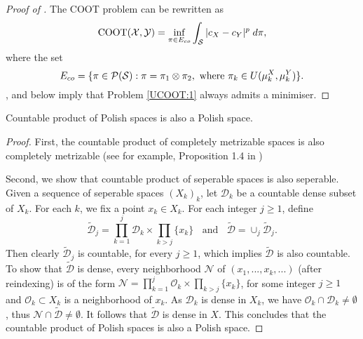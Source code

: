 \begin{proof}[Proof of ]
    The COOT problem can be rewritten as
    \begin{equation} \label{UCOOT:1}
      \text{COOT}(\mathcal X, \mathcal Y) = \inf_{\pi \in E_{co}} \int_{\mathcal S} \vert c_X - c_Y \vert^p \; d\pi,
    \end{equation}
    where the set
    \begin{equation}
      E_{co} = \{ \pi \in \mathcal P(\mathcal S): \pi = \pi_1 \otimes \pi_2,
      \text{ where } \pi_k \in U(\mu_k^X, \mu_k^Y) \}.
    \end{equation}
    ,  and 
    below imply that Problem \eqref{UCOOT:1} always admits a minimiser.
  \end{proof}
  \begin{lemma} \label{product_polish}
    Countable product of Polish spaces is also a Polish space.
  \end{lemma}
  \begin{proof}
    First, the countable product of completely metrizable spaces is also completely metrizable
    (see for example, Proposition 1.4 in \citep{Dominique20})

    Second, we show that countable product of seperable spaces is also seperable.
    Given a sequence of seperable spaces $(X_k)_k$,
    let $\mathcal D_k$ be a countable dense subset of $X_k$. For each $k$,
    we fix a point $x_k \in X_k$. For each integer $j \geq 1$, define
    \begin{equation}
      \widetilde{\mathcal D}_j = \prod_{k=1}^j \mathcal D_k \times \prod_{k > j} \{ x_k \}
      \;\; \text{ and } \;\;
      \widetilde{\mathcal D} = \cup_{j} \widetilde{\mathcal D}_j.
    \end{equation}
    Then clearly $\widetilde{\mathcal D}_j$ is countable, for every $j \geq 1$,
    which implies $\widetilde{\mathcal D}$ is also countable.
    To show that $\widetilde{\mathcal D}$ is dense, every neighborhood $\mathcal N$ of
    $(x_1, ..., x_k, ...)$ (after reindexing) is of the form
    $\mathcal N = \prod_{k=1}^j \mathcal O_k \times \prod_{k > j} \{ x_k \}$,
    for some integer $j \geq 1$ and $\mathcal O_k \subset X_k$ is a neighborhood of $x_k$.
    As $\mathcal D_k$ is dense in $X_k$, we have $\mathcal O_k \cap \mathcal D_k \neq \emptyset$,
    thus $\mathcal N \cap \widetilde{\mathcal D} \neq \emptyset$.
    It follows that $\widetilde{\mathcal D}$ is dense in $X$.
    This concludes that the countable product of Polish spaces is also a Polish space.
  \end{proof}
